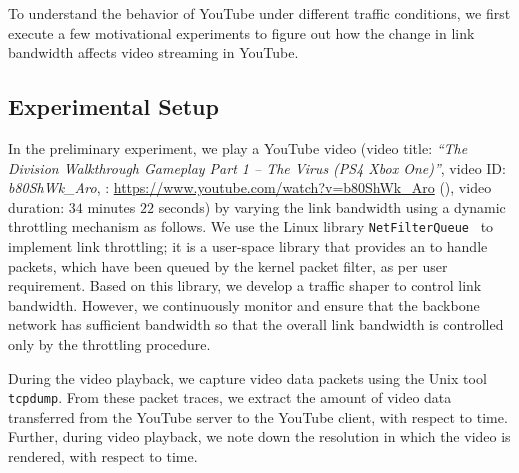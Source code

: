 
To understand the behavior of YouTube under different traffic conditions, we first execute a few motivational experiments to figure out how the change in link bandwidth affects video streaming in YouTube. 

\subsection{Experimental Setup}
In the preliminary experiment, we play a YouTube video (video title: {\em ``The Division Walkthrough Gameplay Part 1 -- The Virus (PS4 Xbox One)''}, video ID: {\em b80ShWk\_Aro}, : \url{https://www.youtube.com/watch?v=b80ShWk_Aro} (\lastaccessedtoday), video duration: $34$ minutes $22$ seconds) by varying the link bandwidth using a dynamic throttling mechanism as follows. We use the Linux library \texttt{NetFilterQueue}~\cite{nfqueue} to implement link throttling; it is a user-space library that provides an  to handle packets, which have been queued by the kernel packet filter, as per user requirement. Based on this library, we develop a traffic shaper to control link bandwidth. However, we continuously monitor and ensure that the backbone network has sufficient bandwidth so that the overall link bandwidth is controlled only by the throttling procedure. 

During the video playback, we capture video data packets using the Unix tool \texttt{tcpdump}. From these packet traces, we extract the amount of video data transferred from the YouTube server to the YouTube client, with respect to time. Further, during video playback, we note down the resolution in which the video is rendered, with respect to time. 

